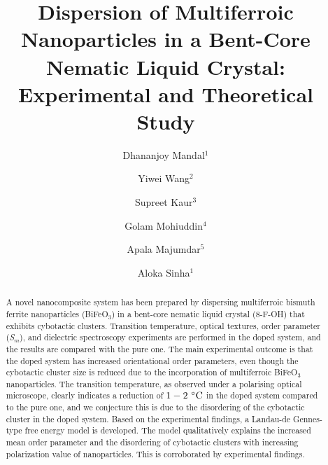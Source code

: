 \documentclass[reprint,amsfonts,amsmath,amssymb,aps,pre,floatfix,10pt]{revtex4-1}
\begin{document}
\title{Dispersion of Multiferroic Nanoparticles in a Bent-Core Nematic Liquid Crystal: Experimental and Theoretical Study}  
\author{Dhananjoy Mandal$^1$}
\author{Yiwei Wang$^2$}
\author{Supreet Kaur$^3$}
\author{Golam Mohiuddin$^4$}
\author{Apala Majumdar$^5$}
\author{Aloka Sinha$^1$}


\begin{abstract}

A novel nanocomposite system has been prepared by dispersing multiferroic bismuth ferrite nanoparticles (BiFeO$_3$) in a bent-core nematic liquid crystal (8-F-OH) that exhibits cybotactic clusters. Transition temperature, optical textures, order parameter (\emph{S$_{m}$}), and dielectric spectroscopy experiments are performed in the doped system, and the results are compared with the pure one. The main experimental outcome is that the doped system has increased orientational order parameters, even though the cybotactic cluster size is reduced due to the incorporation of multiferroic BiFeO$_3$ nanoparticles. The transition temperature, as observed under a polarising optical microscope, clearly indicates a reduction of $1 - 2~ ^\circ{\rm C}$ in the doped system compared to the pure one, and we conjecture this is due to the disordering of the cybotactic cluster in the doped system. Based on the experimental findings, a Landau-de Gennes-type free energy model is developed. The model qualitatively explains the increased mean order parameter and the disordering of cybotactic clusters with increasing polarization value of nanoparticles. This is corroborated by experimental findings.  

\end{abstract}

\maketitle
\end{document}
